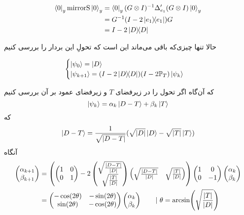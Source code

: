 \begin{align}
    \bra{0}_y \mathrm{mirrorS} \ket{0}_y &= \bra{0}_y (G \otimes I)^{-1} \Delta'_{e_1} (G \otimes I) \ket{0}_y \\ 
     &= G^{-1} (I - 2\dyad{e_1}) G \\
    &= I - 2\dyad{D}
\end{align}

حالا تنها چیزی‌که باقی می‌ماند این است که تحولِ این بردار را بررسی کنیم

\begin{equation}
\begin{cases}
    \ket{\psi_0} = \ket{D} \\
    \ket{\psi_{k+1}} = (I - 2\dyad{D})(I - 2\mathbb{P}_T) \ket{\psi_k}
\end{cases}
\end{equation}

که آن‌گاه اگر تحول را در زیرفضای $T$ و زیرفضای عمود بر آن بررسی کنیم
\begin{equation}
    \ket{\psi_k} = \alpha_k \ket{D - T} + \beta_k \ket{T}
\end{equation}
که
\begin{equation}
    \ket{D - T} = \frac{1}{\sqrt{\abs{D - T}}} (\sqrt{\abs{D}} \ket{D} - \sqrt{\abs{T}} \ket{T})
\end{equation}
آنگاه
\begin{align}
    \begin{pmatrix}
        \alpha_{k+1} \\ \beta_{k+1}
    \end{pmatrix} &=
    \left(\begin{pmatrix}
       1 & 0 \\
       0 & 1
    \end{pmatrix} -
    2\begin{pmatrix}
        \sqrt{\frac{\abs{D - T}}{\abs{D}}} \\
        \sqrt{\frac{\abs{T}}{\abs{D}}}
    \end{pmatrix} \begin{pmatrix}
        \sqrt{\frac{\abs{D - T}}{\abs{D}}} &
        \sqrt{\frac{\abs{T}}{\abs{D}}}
    \end{pmatrix}\right)
    \begin{pmatrix}
       1 & 0 \\
       0 & -1
    \end{pmatrix}
    \begin{pmatrix}
        \alpha_k \\ \beta_k
    \end{pmatrix} \\
    &= \begin{pmatrix}
        -\cos(2\theta) & -\sin(2\theta) \\
        \sin(2\theta) & -\cos(2\theta)
    \end{pmatrix}\begin{pmatrix}
        \alpha_k \\ \beta_k
    \end{pmatrix} \qquad | ~ \theta = \arcsin(\sqrt{\frac{\abs{T}}{\abs{D}}})
\end{align}

